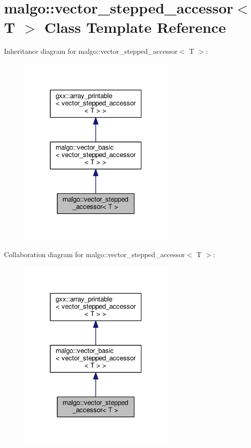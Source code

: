 \hypertarget{classmalgo_1_1vector__stepped__accessor}{}\section{malgo\+:\+:vector\+\_\+stepped\+\_\+accessor$<$ T $>$ Class Template Reference}
\label{classmalgo_1_1vector__stepped__accessor}


Inheritance diagram for malgo\+:\+:vector\+\_\+stepped\+\_\+accessor$<$ T $>$\+:
\nopagebreak
\begin{figure}[H]
\begin{center}
\leavevmode
\includegraphics[width=217pt]{classmalgo_1_1vector__stepped__accessor__inherit__graph}
\end{center}
\end{figure}


Collaboration diagram for malgo\+:\+:vector\+\_\+stepped\+\_\+accessor$<$ T $>$\+:
\nopagebreak
\begin{figure}[H]
\begin{center}
\leavevmode
\includegraphics[width=217pt]{classmalgo_1_1vector__stepped__accessor__coll__graph}
\end{center}
\end{figure}
